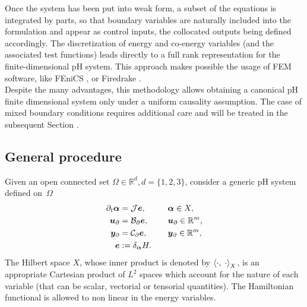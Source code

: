 Once the system has been put into weak form, a subset of the equations is integrated by parts, so that boundary variables are naturally included into the formulation and appear as control inputs, the collocated outputs being defined accordingly. The discretization of energy and co-energy variables (and the associated test functions) leads directly to a full rank representation for the finite-dimensional pH system.  This approach makes possible the usage of FEM software, like FEniCS \cite{logg2012}, or Firedrake \cite{rathgeber2017firedrake}. \\

Despite the many advantages, this methodology allows obtaining a canonical pH finite dimensional system only under a uniform causality assumption. The case of mixed boundary conditions requires additional care and will be treated in the subsequent Section .

\subsection{General procedure}
Given an open connected set $\Omega \in \mathbb{R}^d, d= \{1,2,3\}$, consider a generic pH system defined on~$\Omega$
\begin{equation}\label{eq:phsys2}
\begin{aligned}[t]
\partial_t {\bm{\alpha}} &= \mathcal{J}\displaystyle \bm{e}, \vspace{3pt}\\
\bm{u}_\partial &= \mathcal{B}_\partial  \displaystyle \bm{e}, \vspace{3pt}\\
\bm{y}_\partial &= \mathcal{C}_\partial \displaystyle \bm{e}, \vspace{3pt}\\
\bm{e} &:= \displaystyle \delta_{\bm{\alpha}}H.
\end{aligned} \qquad
\begin{aligned}[t]
&\bm{\alpha} \in X, \\
&\bm{u}_\partial \in \mathbb{R}^m, \\
&\bm{y}_\partial \in \mathbb{R}^m,
\end{aligned}
\end{equation}
The Hilbert space $X$, whose inner product is denoted by $\inner[X]{\cdot}{\cdot}$, is an appropriate Cartesian product of $L^2$ spaces which account for the nature of each variable (that can be scalar, vectorial or tensorial quantities). The Hamiltonian functional is allowed to non linear in the energy variables. \\

